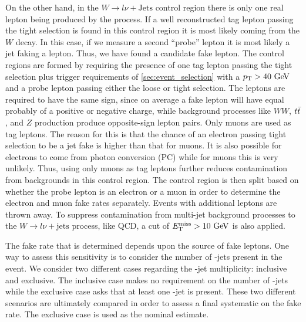 On the other hand, in the 
$W\rightarrow l\nu + \textrm{Jets}$ control region there
is only one real lepton being produced by the process.
If a well reconstructed tag lepton passing the tight selection
is found in this control 
region it is most likely coming from the $W$ decay.
In this case, if we measure a second ``probe'' lepton it is most likely
a jet faking a lepton. Thus, we have found a candidate fake lepton.
The control regions are formed by requiring the presence
of one tag lepton passing the tight selection
plus trigger requirements
of \sec\ref{sec:event_selection} with a $\pt>40\GeV$ and 
a probe lepton passing either the loose or tight selection.
The leptons are required to have the same sign, since
on average a fake lepton will have equal probably of
a positive or negative charge, while background processes
like $WW$, $t\bar{t}$, and $Z$ production produce opposite-sign lepton
pairs.  Only muons are used as tag leptons. 
The reason for this is that the chance of an electron passing tight selection
to be a jet fake is higher than that for muons. It is also 
possible for electrons to come from photon conversion  (PC)
while for muons this is very unlikely. Thus, using only muons as tag
leptons further reduces contamination from backgrounds in this control
region. The control region is then split based on whether the probe
lepton is an electron or a muon in order to determine the electron
and muon fake rates separately.
Events with additional leptons are thrown away.
To suppress contamination from multi-jet background processes
to the $W\rightarrow l\nu + \textrm{jets}$ process, like QCD,
a cut of $\met>10\GeV$ is also applied.

The fake rate that is determined depends upon the source of fake leptons.
One way to assess this sensitivity is to consider the number of
\bee-jets present in the event. We consider two different
cases regarding the \bee-jet multiplicity: inclusive and exclusive.
The inclusive case makes no requirement on the number of \bee-jets
while the exclusive case asks that at least one \bee-jet is present.
These two different scenarios are ultimately compared in order to assess
a final systematic on the fake rate. The exclusive case
is used as the nominal estimate.


